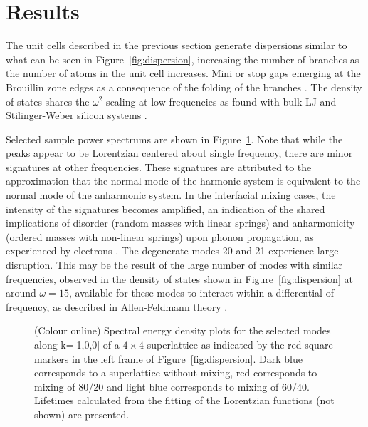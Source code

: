 \documentclass[aps,prb,preprint,preprintnumbers,amsmath,amssymb,floatfix,superscriptaddress]{revtex4}
\begin{document}
\section{Results}
The unit cells described in the previous section generate dispersions similar to what can be seen in Figure~\ref{fig:dispersion}, increasing the number of branches as the number of atoms in the unit cell increases. Mini or stop gaps emerging at the Brouillin zone edges as a consequence of the folding of the branches \cite{PhysRevB.38.1427} \cite{PhysRevB.60.2627}. The density of states shares the $\omega^2$ scaling at low frequencies as found with bulk LJ and Stilinger-Weber silicon systems \cite{}. 
\renewcommand{\topfraction}{0.7}
\begin{figure*}[ht!]
\begin{center}
\renewcommand{\figure}{Fig.}
\caption{Dispersion of a 4x4 superlattice for modes normal to the interfaces. Red squares represent select modes for $\pmb{\kappa}$=[1,0,0].}
\label{fig:dispersion}
\end{center}
\end{figure*}
Selected sample power spectrums are shown in Figure~\ref{fig:sed}. Note that while the peaks appear to be Lorentzian centered about single frequency, there are minor signatures at other frequencies. These signatures are attributed to the approximation that the normal mode of the harmonic system is equivalent to the normal mode of the anharmonic system. In the interfacial mixing cases, the intensity of the signatures becomes amplified, an indication of the shared implications of disorder (random masses with linear springs) and anharmonicity (ordered masses with non-linear springs) \cite{RevModPhys.53.175} upon phonon propagation, as experienced by electrons \cite{mott1961theory}. The degenerate modes 20 and 21 experience large disruption. This may be the result of the large number of modes with similar frequencies, observed in the density of states shown in Figure~\ref{fig:dispersion} at around $\omega=15$, available for these modes to interact within a differential of frequency, as described in Allen-Feldmann theory \cite{allen_thermal_1993,feldman_thermal_1993-1}.
\begin{figure}[!h]
\begin{center}
\renewcommand{\figure}{Fig.}
\caption{(Colour online) Spectral energy density plots for the selected modes along k=[1,0,0] of a $4\times4$ superlattice as indicated by the red square markers in the left frame of Figure~\ref{fig:dispersion}. Dark blue corresponds to a superlattice without mixing, red corresponds to mixing of 80/20 and light blue corresponds to mixing of 60/40. Lifetimes calculated from the fitting of the Lorentzian functions (not shown) are presented.}
\label{fig:sed}
\end{center}
\end{figure}
\end{document}
